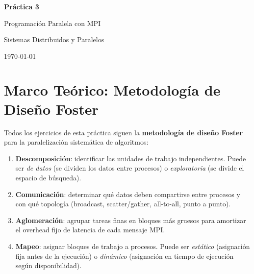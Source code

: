 \documentclass[12pt,a4paper]{article}
\begin{document}
\begin{titlepage}
  \centering
  \vspace*{2cm}
  {\Huge\bfseries Práctica 3\par}
  \vspace{0.5cm}
  {\LARGE Programación Paralela con MPI\par}
  \vspace{1.5cm}
  {\large Sistemas Distribuidos y Paralelos\par}
  \vspace{3cm}
  \begin{abstract}
    \noindent
    Este informe documenta el diseño e implementación de soluciones paralelas usando
    MPI (Message Passing Interface) en C para los algoritmos secuenciales de la
    Práctica 1. Por cada ejercicio se aplica la metodología de diseño de Foster
    (Descomposición, Comunicación, Aglomeración, Mapeo), se analizan las ventajas
    y desventajas de las herramientas utilizadas, y se estudian alternativas en
    otros lenguajes de programación tanto compilados como interpretados.
  \end{abstract}
  \vfill
  {\large \today\par}
\end{titlepage}

\tableofcontents
\newpage

\section*{Marco Teórico: Metodología de Diseño Foster}

Todos los ejercicios de esta práctica siguen la \textbf{metodología de diseño Foster}
para la paralelización sistemática de algoritmos:

\begin{enumerate}[leftmargin=*]
  \item \textbf{Descomposición}: identificar las unidades de trabajo independientes.
    Puede ser \textit{de datos} (se dividen los datos entre procesos) o
    \textit{exploratoria} (se divide el espacio de búsqueda).
  \item \textbf{Comunicación}: determinar qué datos deben compartirse entre procesos
    y con qué topología (broadcast, scatter/gather, all-to-all, punto a punto).
  \item \textbf{Aglomeración}: agrupar tareas finas en bloques más gruesos para
    amortizar el overhead fijo de latencia de cada mensaje MPI.
  \item \textbf{Mapeo}: asignar bloques de trabajo a procesos. Puede ser
    \textit{estático} (asignación fija antes de la ejecución) o
    \textit{dinámico} (asignación en tiempo de ejecución según disponibilidad).
\end{enumerate}
\end{document}
